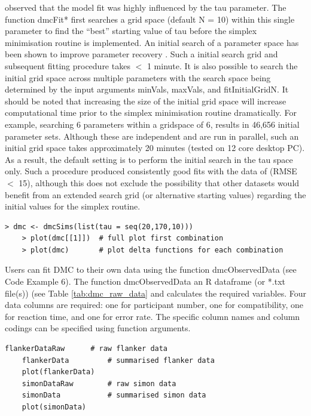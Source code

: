 \textcite{ulrich2015automatic} observed that the model fit was highly
influenced by the tau parameter. The function dmcFit* first searches a grid
space (default N = 10) within this single parameter to find the ``best'' starting
value of tau before the simplex minimisation routine is implemented. An initial
search of a parameter space has been shown to improve parameter recovery
\parencite{hubnerimproving}. Such a initial search grid and subsequent fitting
procedure takes $<$ 1 minute. It is also possible to search the initial grid
space across multiple parameters with the search space being determined by the
input arguments minVals, maxVals, and fitInitialGridN. It should be noted that
increasing the size of the initial grid space will increase computational time
prior to the simplex minimisation routine dramatically. For example, searching
6 parameters within a gridspace of 6, results in 46,656 initial parameter sets.
Although these are independent and are run in parallel, such an initial grid
space takes approximately 20 minutes (tested on 12 core desktop PC). As a
result, the default setting is to perform the initial search in the tau space
only. Such a procedure produced consistently good fits with the data of
\textcite{ulrich2015automatic} (RMSE $<$ 15), although this does not exclude the
possibility that other datasets would benefit from an extended search grid (or
alternative starting values) regarding the initial values for the simplex
routine.


\begin{minipage}{\linewidth}
    \begin{lstlisting}[style = R, title = {R Code Example 3}, captionpos = t]
    > dmc <- dmcSims(list(tau = seq(20,170,10)))
    > plot(dmc[[1]])  # full plot first combination
    > plot(dmc)       # plot delta functions for each combination
    \end{lstlisting}
\end{minipage}

Users can fit DMC to their own data using the function dmcObservedData (see
Code Example 6). The function dmcObservedData an R dataframe (or *.txt file(s))
(see Table \ref{tab:dmc_raw_data} and calculates the required variables. Four
data columns are required: one for participant number, one for compatibility,
one for reaction time, and one for error rate. The specific column names and
column codings can be specified using function arguments.

\begin{minipage}{\linewidth}
    \begin{lstlisting}[style = R, title = {R Code Example 4}, captionpos = t]
    flankerDataRaw      # raw flanker data
    flankerData         # summarised flanker data
    plot(flankerData)
    simonDataRaw        # raw simon data
    simonData           # summarised simon data
    plot(simonData)
    \end{lstlisting}
\end{minipage}

